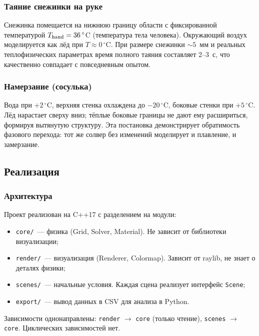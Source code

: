 \subsubsection{Таяние снежинки на руке}

Снежинка помещается на нижнюю границу области с фиксированной температурой
$T_{\rm hand} = 36\,^{\circ}$C (температура тела человека). Окружающий воздух
моделируется как лёд при $T \approx 0\,^{\circ}$C. При размере снежинки $\sim 5$~мм
и реальных теплофизических параметрах время полного таяния составляет 2--3~с,
что качественно совпадает с повседневным опытом.

\subsubsection{Намерзание (сосулька)}

Вода при $+2\,^{\circ}$C, верхняя стенка охлаждена до $-20\,^{\circ}$C,
боковые стенки при $+5\,^{\circ}$C. Лёд нарастает сверху вниз; тёплые
боковые границы не дают ему расшириться, формируя вытянутую структуру.
Эта постановка демонстрирует обратимость фазового перехода: тот же
солвер без изменений моделирует и плавление, и замерзание.

\subsection{Реализация}

\subsubsection{Архитектура}

Проект реализован на C++17 с разделением на модули:
\begin{itemize}
  \item \texttt{core/}~--- физика (Grid, Solver, Material). Не зависит от
        библиотеки визуализации;
  \item \texttt{render/}~--- визуализация (Renderer, Colormap). Зависит
        от raylib, не знает о деталях физики;
  \item \texttt{scenes/}~--- начальные условия. Каждая сцена реализует
        интерфейс \texttt{Scene};
  \item \texttt{export/}~--- вывод данных в CSV для анализа в Python.
\end{itemize}

Зависимости однонаправлены: \texttt{render} $\to$ \texttt{core} (только чтение),
\texttt{scenes} $\to$ \texttt{core}. Циклических зависимостей нет.

